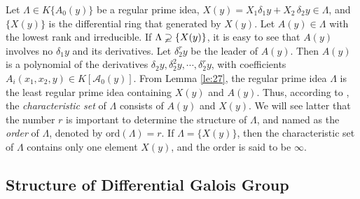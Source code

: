 \documentclass[preprint, 12pt]{elsarticle}
\numberwithin{equation}{section}
\newcommand{\A}{\mathcal{A}}
\begin{document}
Let $\Lambda\in K\{A_0(y)\}$ be a regular prime idea, $X(y) =
X_1\delta_1y + X_2\,\delta_2y\in \Lambda$, and $\{X(y)\}$ is the
differential ring that generated by $X(y)$. Let $A(y)\in \Lambda$
with the lowest rank and irreducible. If
$\Lambda\varsupsetneq\{X(y)\}$, it is easy to see that $A(y)$ involves
no $\delta_1y$ and its derivatives. Let $\delta_2^ry$ be the
leader of $A(y)$. Then $A(y)$ is a polynomial of the derivatives
$\delta_2y,\delta_2^2y,\cdots,\delta_2^ry$, with coefficients
$A_i(x_1,x_2,y)\in K[\A_0(y)]$. From Lemma \ref{le:27}, the regular
prime idea $\Lambda$ is the least regular prime idea containing
$X(y)$ and $A(y)$. Thus, according to \cite[pp. 4-5]{Ritt:50}, the \textit{characteristic set} of
$\Lambda$ consists of $A(y)$ and $X(y)$. We will see latter that the number $r$ is
important to determine the structure of $\Lambda$, and named as
the \textit{order} of $\Lambda$, denoted by $\mathrm{ord}(\Lambda) = r$. If
$\Lambda = \{X(y)\}$, then the characteristic set of $\Lambda$
contains only one element $X(y)$, and the order is said to be
$\infty$.

\subsection{Structure of Differential Galois Group}
\label{sec:3:1}
\end{document}
